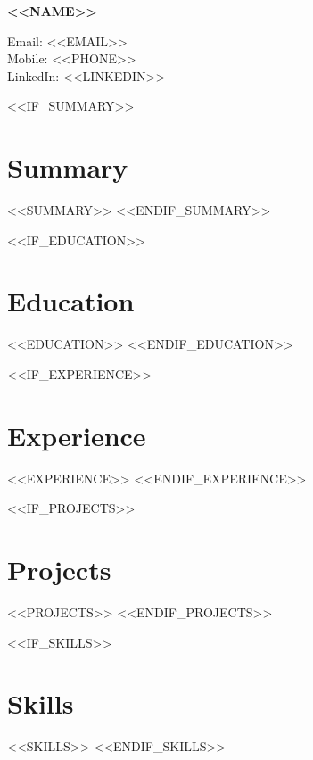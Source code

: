 \documentclass[11pt]{article} %
\begin{document}
\begin{center}
	\begin{minipage}{0.5\textwidth}
		{\Huge\bfseries
			<<NAME>>
		}
	\end{minipage} \hfill
	\begin{minipage}{0.4\textwidth}
		\raggedleft
		Email: <<EMAIL>> \\
		Mobile: <<PHONE>> \\
		LinkedIn: <<LINKEDIN>>
	\end{minipage}
\end{center}

<<IF_SUMMARY>>
\section{Summary}
<<SUMMARY>>
<<ENDIF_SUMMARY>>

<<IF_EDUCATION>>
\section{Education}
<<EDUCATION>>
<<ENDIF_EDUCATION>>

<<IF_EXPERIENCE>>
\section{Experience}
<<EXPERIENCE>>
<<ENDIF_EXPERIENCE>>

<<IF_PROJECTS>>
\section{Projects}
<<PROJECTS>>
<<ENDIF_PROJECTS>>

<<IF_SKILLS>>
\section{Skills}
<<SKILLS>>
<<ENDIF_SKILLS>>
\end{document}
